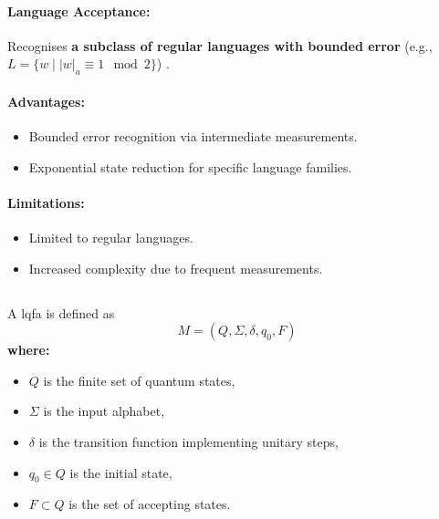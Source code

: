 \paragraph{Language Acceptance:}  
Recognises \textbf{a subclass of regular languages with bounded error} (e.g., \( L = \{w \mid |w|_a \equiv 1 \mod 2\} \)) \cite{ambainis1998}.

\paragraph{Advantages:}
\begin{itemize}
    \item Bounded error recognition via intermediate measurements.
    \item Exponential state reduction for specific language families.
\end{itemize}

\paragraph{Limitations:}
\begin{itemize}
    \item Limited to regular languages.
    \item Increased complexity due to frequent measurements.
\end{itemize}

\subsection{}
\label{subsec:lqfa}
\begin{definition}
A \gls{lqfa} is defined as 
\[
M = (Q, \Sigma, \delta, q_0, F)
\]
\textbf{where:}
\begin{itemize}
    \item \( Q \) is the finite set of quantum states,
    \item \( \Sigma \) is the input alphabet,
    \item \( \delta \) is the transition function implementing unitary steps,
    \item \( q_0 \in Q \) is the initial state,
    \item \( F \subset Q \) is the set of accepting states.
\end{itemize}
\end{definition}

